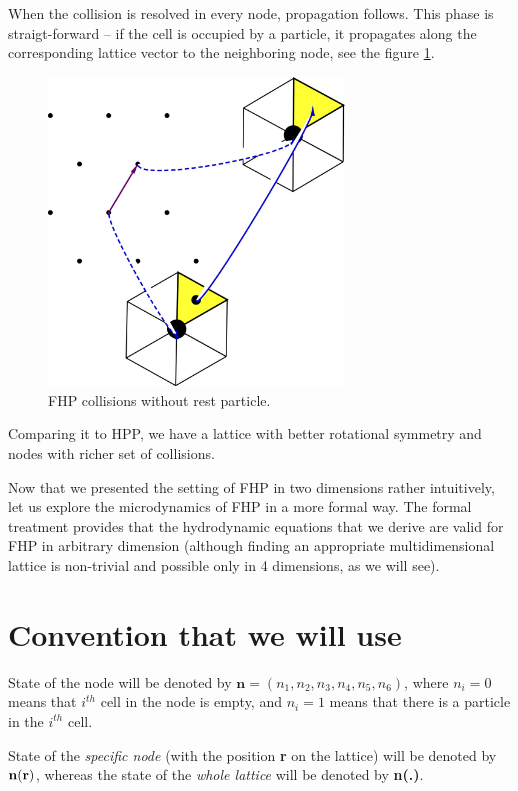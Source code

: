 When the collision is resolved in every node, propagation follows.
This phase is straigt-forward -- if the cell is occupied by a particle, it propagates along the corresponding lattice vector to the neighboring node, see the figure \ref{FHPprop}.


\begin{figure}[H]
 \centering
 \includegraphics[width=0.7\textwidth]{./img/FHPprop}
 \caption{FHP collisions without rest particle.}
 \label{FHPprop}
\end{figure}

Comparing it to HPP, we have a lattice with better rotational symmetry and nodes with richer  set of collisions.

Now that we presented the setting of FHP in two dimensions rather intuitively, let us explore the microdynamics of FHP in a more formal way. The formal treatment provides that the hydrodynamic equations that we derive are valid for FHP in arbitrary dimension (although finding an appropriate multidimensional lattice is non-trivial and possible only in 4 dimensions, as we will see).

\section{Convention that we will use}
State of the node will be denoted by $\bm{n} = (n_1,n_2,n_3,n_4,n_5,n_6)$, where $n_i = 0$ means that $i^{th}$ cell in the node is empty, and $n_i = 1$ means that there is a particle in the $i^{th}$ cell.

State of the \textit{specific node} (with the position \textbf{r} on the lattice) will be denoted by $\bf{n(r)}$, whereas the state of the \textit{whole lattice} will be denoted by \textbf{n(.)}.

